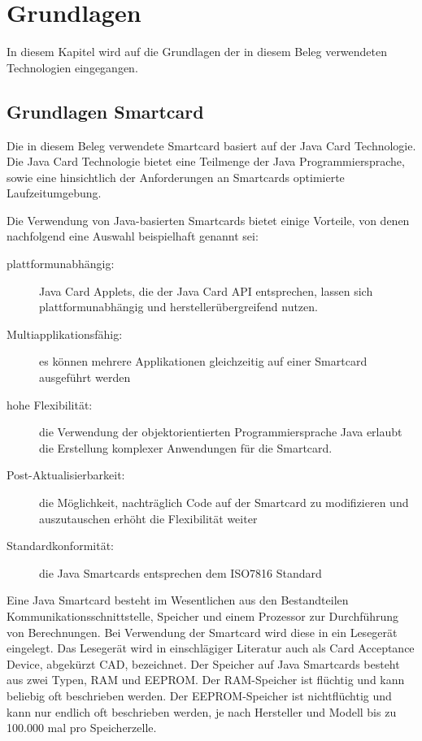 \documentclass[a4paper,12pt]{scrartcl}
\begin{document}
\clearpage
\section{Grundlagen}
\label{sec:2}
In diesem Kapitel wird auf die Grundlagen der in diesem Beleg verwendeten Technologien eingegangen.

\subsection{Grundlagen Smartcard}
\label{subsec:2.1}
Die in diesem Beleg verwendete Smartcard basiert auf der Java Card Technologie. Die Java Card Technologie bietet eine 
Teilmenge der Java Programmiersprache, sowie eine hinsichtlich der Anforderungen an Smartcards optimierte Laufzeitumgebung.

Die Verwendung von Java-basierten Smartcards bietet einige Vorteile, von denen nachfolgend eine Auswahl beispielhaft genannt sei: \cite{jcopdoc}

\begin{description}
\item[plattformunabhängig:] Java Card Applets, die der Java Card API entsprechen, lassen sich plattformunabhängig und herstellerübergreifend nutzen.
\item[Multiapplikationsfähig:] es können mehrere Applikationen gleichzeitig auf einer Smartcard ausgeführt werden
\item[hohe Flexibilität:] die Verwendung der objektorientierten Programmiersprache Java erlaubt die Erstellung komplexer Anwendungen für die Smartcard.  
\item[Post-Aktualisierbarkeit:] die Möglichkeit, nachträglich Code auf der Smartcard zu modifizieren und auszutauschen erhöht die Flexibilität weiter
\item[Standardkonformität:] die Java Smartcards entsprechen dem ISO7816 Standard \cite{iso7816}
\end{description}

Eine Java Smartcard besteht im Wesentlichen aus den Bestandteilen Kommunikationsschnittstelle, Speicher und einem Prozessor zur Durchführung von Berechnungen.
Bei Verwendung der Smartcard wird diese in ein Lesegerät eingelegt. Das Lesegerät wird in einschlägiger Literatur auch als Card Acceptance Device, abgekürzt CAD, bezeichnet.
Der Speicher auf Java Smartcards besteht aus zwei Typen, RAM und EEPROM. Der RAM-Speicher ist flüchtig und kann beliebig oft beschrieben werden. Der EEPROM-Speicher ist nichtflüchtig und kann nur endlich oft beschrieben werden, je nach Hersteller und Modell bis zu 100.000 mal pro Speicherzelle.  
\end{document}
